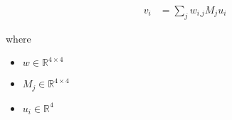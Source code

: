 \documentclass[12pt]{article}
\begin{document}
\begin{align*}
\textit{v}_{ \textit{i} } & = \sum_\textit{j} \textit{w}_{\textit{i}, \textit{j}}\textit{M}_{ \textit{j} }\textit{u}_{ \textit{i} }
\end{align*}

where
\begin{itemize}
\item $\textit{w} \in \mathbb{R}^{ 4 \times 4 }$
\item $\textit{M}_{\textit{j}} \in \mathbb{R}^{ 4 \times 4 }$
\item $\textit{u}_{\textit{i}} \in \mathbb{R}^{ 4}$
\end{itemize}
\end{document}
